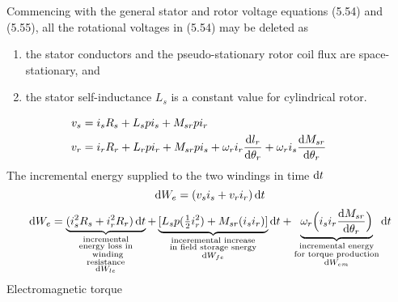 \documentclass[a4paper,numbers=noenddot,12pt]{scrbook}
\begin{document}
        Commencing with the general stator and rotor voltage equations (5.54) and (5.55), all the rotational voltages in (5.54) may be deleted as
        \noindent
        \begin{enumerate}
            \item the stator conductors and the pseudo-stationary rotor coil flux are space-stationary, and
            \item the stator self-inductance $L_s$ is a constant value for cylindrical rotor.
        \end{enumerate} 
        \begin{align}
            v_s & = i_s R_s + L_s p i_s + M_{sr} p i_r \\
            v_r & = i_r R_r + L_r p i_r + M_{sr} p i_s + \omega_r i_r \frac{\dif l_r}{\dif \theta_r} + \omega_r i _s \frac{\dif M_{sr}}{\dif \theta_r} &&
        \end{align}
        The incremental energy supplied to the two windings in time $\dif t$
        \begin{equation}
            \dif W_e = (v_s i_s + v_r i_r) \dif t
        \end{equation}
        \begin{equation}
            \dif W_e = \underbrace{(i_s^2 R_s + i_r^2 R_r)\dif t}_
            {\substack{\text{incremental}\\ 
            \text{energy loss in}\\ 
            \text{winding} \\
            \text{resistance} \\ 
            \dif W_{le}}} + 
            \underbrace{[L_s p (\tfrac{1}{2}i_r^2) + M_{sr}(i_s i_r)]}_
            {\substack{\text{inceremental increase}\\
            \text{in field storage snergy}\\
            \dif W_{fe}}}
            \dif t
            + \underbrace{\omega_r \Big( i_s i_r \frac{\dif M_{sr}}{\dif \theta_r} \Big)}_
            {\substack{\text{incremental energy} \\
            \text{for torque production} \\
            \dif W_{em}}}
            \dif t		
        \end{equation}
        Electromagnetic torque
\end{document}
